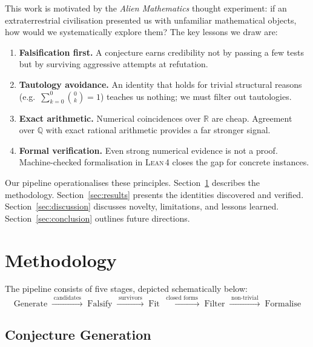 \documentclass[11pt,a4paper]{article}
\theoremstyle{definition}
\theoremstyle{remark}
\newcommand{\Q}{\mathbb{Q}}
\newcommand{\R}{\mathbb{R}}
\newcommand{\lean}{\textsc{Lean\,4}}
\begin{document}
This work is motivated by the \emph{Alien Mathematics} thought experiment:
if an extraterrestrial civilisation presented us with unfamiliar
mathematical objects, how would we systematically explore them?
The key lessons we draw are:
\begin{enumerate}
  \item \textbf{Falsification first.}
        A conjecture earns credibility not by passing a few tests
        but by surviving aggressive attempts at refutation.
  \item \textbf{Tautology avoidance.}
        An identity that holds for trivial structural reasons
        (e.g.\ $\sum_{k=0}^{0}\binom{0}{k}=1$) teaches us nothing;
        we must filter out tautologies.
  \item \textbf{Exact arithmetic.}
        Numerical coincidences over $\R$ are cheap.
        Agreement over $\Q$ with exact rational arithmetic
        provides a far stronger signal.
  \item \textbf{Formal verification.}
        Even strong numerical evidence is not a proof.
        Machine-checked formalisation in \lean{} closes the gap
        for concrete instances.
\end{enumerate}

Our pipeline operationalises these principles.
Section~\ref{sec:method} describes the methodology.
Section~\ref{sec:results} presents the identities discovered and verified.
Section~\ref{sec:discussion} discusses novelty, limitations, and
lessons learned.
Section~\ref{sec:conclusion} outlines future directions.


\section{Methodology}\label{sec:method}

The pipeline consists of five stages, depicted schematically below:
\[
\boxed{\text{Generate}}
\;\xrightarrow{\;\text{candidates}\;}\;
\boxed{\text{Falsify}}
\;\xrightarrow{\;\text{survivors}\;}\;
\boxed{\text{Fit}}
\;\xrightarrow{\;\text{closed forms}\;}\;
\boxed{\text{Filter}}
\;\xrightarrow{\;\text{non-trivial}\;}\;
\boxed{\text{Formalise}}
\]

\subsection{Conjecture Generation}\label{sec:generation}
\end{document}
